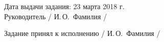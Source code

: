{    Дата выдачи задания: 23 марта 2018 г.\\
    Руководитель \hfill{} \uline{\hspace*{4em}} / И.\,О.~Фамилия /

    Задание принял к исполнению \hfill{} \uline{\hspace*{4em}} / И.\,О.~Фамилия /

    \restoregeometry
}
